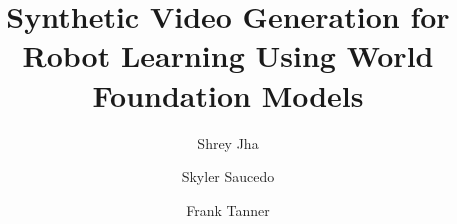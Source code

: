 \documentclass[runningheads]{llncs}
\begin{document}
\title{Synthetic Video Generation for Robot Learning Using World Foundation Models}

\author{Shrey Jha \and Skyler Saucedo \and Frank Tanner}


\maketitle











\end{document}

